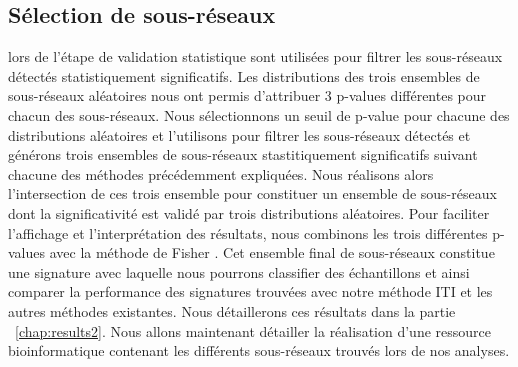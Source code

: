 		\subsection{\textcolor{green!45!black}{Sélection de sous-réseaux}}
			 lors de l'étape de validation statistique sont utilisées pour filtrer les sous-réseaux détectés statistiquement significatifs.
			Les distributions des trois ensembles de sous-réseaux aléatoires nous ont permis d'attribuer 3 p-values différentes pour chacun des sous-réseaux.
			Nous sélectionnons un seuil de p-value pour chacune des distributions aléatoires et l'utilisons pour filtrer les sous-réseaux détectés et générons trois ensembles de sous-réseaux stastitiquement significatifs suivant chacune des méthodes précédemment expliquées.
			Nous réalisons alors l'intersection de ces trois ensemble pour constituer un ensemble de sous-réseaux dont la significativité est validé par trois distributions aléatoires.
			Pour faciliter l'affichage et l'interprétation des résultats, nous combinons les trois différentes p-values avec la méthode de Fisher \citep{Fisher1925}.
			Cet ensemble final de sous-réseaux constitue une signature avec laquelle nous pourrons classifier des échantillons et ainsi comparer la performance des signatures trouvées avec notre méthode ITI et les autres méthodes existantes.
			Nous détaillerons ces résultats dans la partie ~\ref{chap:results2}.
			Nous allons maintenant détailler la réalisation d'une ressource bioinformatique contenant les différents sous-réseaux trouvés lors de nos analyses.

